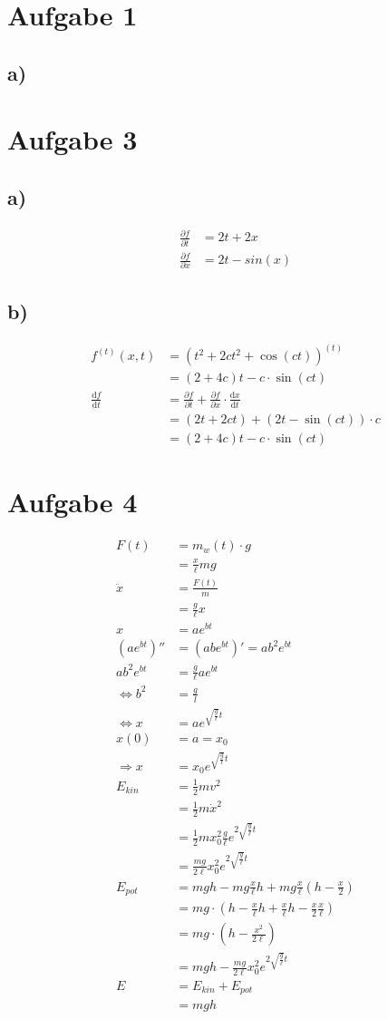 \documentclass[12pt,a4paper,notitlepage]{article}
\title{}
\newcommand{\diff}{\mathrm{d}}
\newcommand{\aufgabe}[1]{\section*{\setcounter{section}{#1}Aufgabe #1}}
\begin{document}
\aufgabe{1}
\subsection*{a)}
\aufgabe{3}
\subsection*{a)}
\begin{align}
\frac{\partial f}{\partial t}&=2t+2x\\
\frac{\partial f}{\partial x}&=2t-sin(x)
\end{align}
\subsection*{b)}
\begin{align}
f^{(t)}(x,t)&=\left(t^2+2ct^2+\cos\left(ct\right)\right)^{(t)}\\
&=(2+4c)t-c\cdot\sin\left(ct\right)\\
\frac{\diff f}{\diff t}&=\frac{\partial f}{\partial t}+\frac{\partial f}{\partial x}\cdot\frac{\diff x}{\diff t}\\
&=\left(2t+2ct\right)+\left(2t-\sin(ct)\right)\cdot c\\
&=\left(2+4c\right)t-c\cdot\sin(ct)
\end{align}
\aufgabe{4} %
\begin{align}
F(t)&=m_w(t)\cdot g\\
&=\frac{x}{\ell}mg\\
\ddot x&=\frac{F(t)}{m}\\
&=\frac{g}{\ell}x\\
x&=ae^{bt}\\
\left(ae^{bt}\right)''&=\left(abe^{bt}\right)'=ab^2e^{bt}\\
ab^2e^{bt}&=\frac{g}{\ell}ae^{bt}\\
\Leftrightarrow b^2&=\frac{g}{l}\\
\Leftrightarrow x&=ae^{\sqrt{\frac{g}{\ell}}t}\\
x(0)&=a=x_0\\
\Rightarrow x&=x_0e^{\sqrt{\frac{g}{\ell}}t}\\
E_{kin}&=\frac{1}{2}mv^2\\
&=\frac{1}{2}m\dot x^2\\
&=\frac{1}{2}mx_0^2\frac{g}{\ell}e^{2\sqrt{\frac{g}{\ell}}t}\\
&=\frac{mg}{2\ell}x_0^2e^{2\sqrt{\frac{g}{\ell}}t}\\
E_{pot}&=mgh-mg\frac{x}{\ell}h+mg\frac{x}{\ell}\left(h-\frac{x}{2}\right)\\
&=mg\cdot\left(h-\frac{x}{\ell}h+\frac{x}{\ell}h-\frac{x}{2}\frac{x}{\ell}\right)\\
&=mg\cdot\left(h-\frac{x^2}{2\ell}\right)\\
&=mgh-\frac{mg}{2\ell}x_0^2e^{2\sqrt{\frac{g}{\ell}}t}\\
E&=E_{kin}+E_{pot}\\
&=mgh
\end{align}
\end{document}

